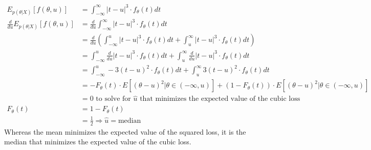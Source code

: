 \begin{align*}
    E_{p(\theta|X)}[f(\theta,u)] &= \int_{-\infty}^{\infty}|t-u|^3\cdot f_{\theta}(t) dt\\
    \frac{d}{du}E_{p(\theta|X)}[f(\theta,u)] &= \frac{d}{du}\int_{-\infty}^{\infty}|t-u|^3\cdot f_{\theta}(t) dt\\
    &= \frac{d}{du}\left(\int_{-\infty}^{u}|t-u|^3\cdot f_{\theta}(t) dt + \int_{u}^{\infty}|t-u|^3\cdot f_{\theta}(t) dt\right)\\
    &= \int_{-\infty}^{u}\frac{d}{du}|t-u|^3\cdot f_{\theta}(t) dt + \int_{u}^{\infty}\frac{d}{du}|t-u|^3\cdot f_{\theta}(t) dt\\
    &= \int_{-\infty}^{u}-3(t-u)^2\cdot f_{\theta}(t) dt + \int_{u}^{\infty}3(t-u)^2\cdot f_{\theta}(t) dt\\
    &= -F_{\theta}(t)\cdot E[(\theta-u)^2|\theta \in (-\infty,u)] + (1-F_{\theta}(t))\cdot E[(\theta-u)^2|\theta \in (-\infty,u)]\\
    &= 0 \text{ to solve for } \hat{u} \text{ that minimizes the expected value of the cubic loss}\\
    F_{\theta}(t) &= 1 - F_{\theta}(t)\\
    &= \frac{1}{2} \Rightarrow \hat{u} = \text{median}
\end{align*}
Whereas the mean minimizes the expected value of the squared loss, it is the median that minimizes the expected value of the cubic loss.